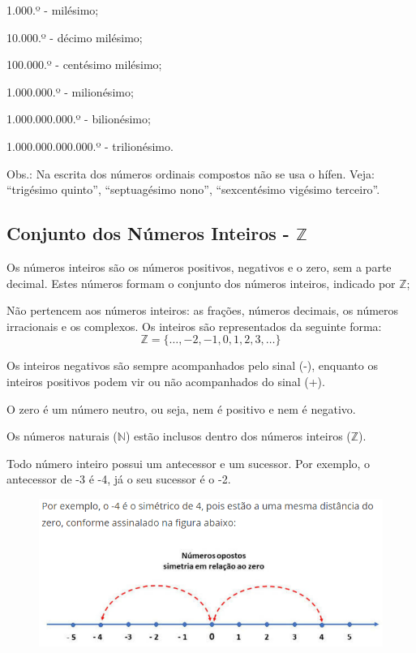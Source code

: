 \begin{multicols*}{2}
\begin{enumerate}
		      1.000.º - milésimo;

		      10.000.º - décimo milésimo;

		      100.000.º - centésimo milésimo;

		      1.000.000.º - milionésimo;

		      1.000.000.000.º - bilionésimo;

		      1.000.000.000.000.º - trilionésimo.

		      Obs.: Na escrita dos números ordinais compostos não se usa o hífen. Veja: “trigésimo quinto”, “septuagésimo nono”, “sexcentésimo vigésimo terceiro”.

	\end{enumerate}

	\subsection*{Conjunto dos Números Inteiros - $\mathbb{Z}$}

	Os números inteiros são os números positivos, negativos e o zero, sem a parte decimal. Estes números formam o conjunto dos números inteiros, indicado por $\mathbb{Z}$;

	Não pertencem aos números inteiros: as frações, números decimais, os números irracionais e os complexos. Os inteiros são representados da seguinte forma:
	\[\mathbb{Z} = \{{\dots, -2, -1, 0, 1, 2, 3, \dots\}}\]

	Os inteiros negativos são sempre acompanhados pelo sinal (-), enquanto os inteiros positivos podem vir ou não acompanhados do sinal (+).

	O zero é um número neutro, ou seja, nem é positivo e nem é negativo.

	Os números naturais ($\mathbb{N}$) estão inclusos dentro dos números inteiros ($\mathbb{Z}$).

	Todo número inteiro possui um antecessor e um sucessor. Por exemplo, o antecessor de -3 é -4, já o seu sucessor é o -2.\\

	\begin{figure}[H]
		\centering
		\includegraphics[width=\columnwidth]{assets/Reta Conjunto dos Inteiros.png}
	\end{figure}



\end{multicols*}

